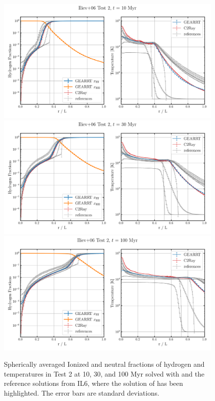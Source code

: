 \begin{figure}
 \centering
 \includegraphics[width=.85\textwidth]{figures/RHD/Iliev2/output_0001.png}\\%
 \includegraphics[width=.85\textwidth]{figures/RHD/Iliev2/output_0003.png}\\%
 \includegraphics[width=.85\textwidth]{figures/RHD/Iliev2/output_0010.png}%
 \caption{
Spherically averaged Ionized and neutral fractions of hydrogen and temperatures in  Test 2 at 10,
30, and 100 Myr solved with \GEARRT and the reference solutions from IL6, where the solution of
 has been highlighted. The error bars are standard deviations.
 }
 \label{fig:iliev2}
\end{figure}




